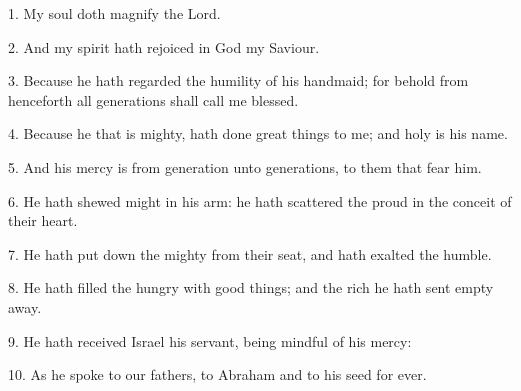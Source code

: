 1. My soul doth magnify the Lord.

2. And my spirit hath rejoiced in God my Saviour.

3. Because he hath regarded the humility of his handmaid; for behold from henceforth all generations shall call me blessed.

4. Because he that is mighty, hath done great things to me; and holy is his name.

5. And his mercy is from generation unto generations, to them that fear him.

6. He hath shewed might in his arm: he hath scattered the proud in the conceit of their heart.

7. He hath put down the mighty from their seat, and hath exalted the humble.

8. He hath filled the hungry with good things; and the rich he hath sent empty away.

9. He hath received Israel his servant, being mindful of his mercy: 

10. As he spoke to our fathers, to Abraham and to his seed for ever. 